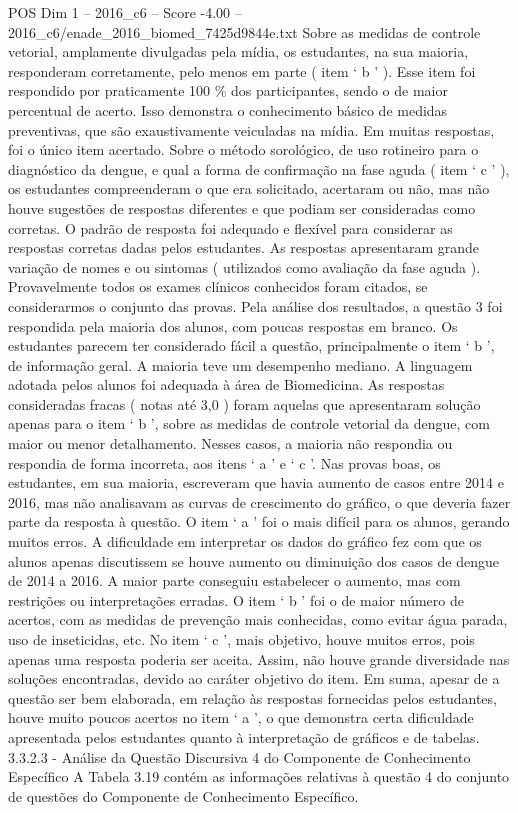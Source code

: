 \begin{textsample}{POS Dim 1 – 2016\_c6 – Score -4.00 – 2016\_c6/enade\_2016\_biomed\_7425d9844e.txt}
Sobre as medidas de controle vetorial, amplamente divulgadas pela mídia, os estudantes, na sua maioria, responderam corretamente, pelo menos em parte ( item ‘ b ’ ).
Esse item foi respondido por praticamente 100 \% dos participantes, sendo o de maior percentual de acerto.
Isso demonstra o conhecimento básico de medidas preventivas, que são exaustivamente veiculadas na mídia.
Em muitas respostas, foi o único item acertado.
Sobre o método sorológico, de uso rotineiro para o diagnóstico da dengue, e qual a forma de confirmação na fase aguda ( item ‘ c ’ ), os estudantes compreenderam o que era solicitado, acertaram ou não, mas não houve sugestões de respostas diferentes e que podiam ser consideradas como corretas.
O padrão de resposta foi adequado e flexível para considerar as respostas corretas dadas pelos estudantes.
As respostas apresentaram grande variação de nomes e ou sintomas ( utilizados como avaliação da fase aguda ).
Provavelmente todos os exames clínicos conhecidos foram citados, se considerarmos o conjunto das provas.
Pela análise dos resultados, a questão 3 foi respondida pela maioria dos alunos, com poucas respostas em branco.
Os estudantes parecem ter considerado fácil a questão, principalmente o item ‘ b ’, de informação geral.
A maioria teve um desempenho mediano.
A linguagem adotada pelos alunos foi adequada à área de Biomedicina.
As respostas consideradas fracas ( notas até 3,0 ) foram aquelas que apresentaram solução apenas para o item ‘ b ’, sobre as medidas de controle vetorial da dengue, com maior ou menor detalhamento.
Nesses casos, a maioria não respondia ou respondia de forma incorreta, aos itens ‘ a ’ e ‘ c ’.
Nas provas boas, os estudantes, em sua maioria, escreveram que havia aumento de casos entre 2014 e 2016, mas não analisavam as curvas de crescimento do gráfico, o que deveria fazer parte da resposta à questão.
O item ‘ a ’ foi o mais difícil para os alunos, gerando muitos erros.
A dificuldade em interpretar os dados do gráfico fez com que os alunos apenas discutissem se houve aumento ou diminuição dos casos de dengue de 2014 a 2016.
A maior parte conseguiu estabelecer o aumento, mas com restrições ou interpretações erradas.
O item ‘ b ’ foi o de maior número de acertos, com as medidas de prevenção mais conhecidas, como evitar água parada, uso de inseticidas, etc.
No item ‘ c ’, mais objetivo, houve muitos erros, pois apenas uma resposta poderia ser aceita.
Assim, não houve grande diversidade nas soluções encontradas, devido ao caráter objetivo do item.
Em suma, apesar de a questão ser bem elaborada, em relação às respostas fornecidas pelos estudantes, houve muito poucos acertos no item ‘ a ’, o que demonstra certa dificuldade apresentada pelos estudantes quanto à interpretação de gráficos e de tabelas. 3.3.2.3 - Análise da Questão Discursiva 4 do Componente de Conhecimento Específico A Tabela 3.19 contém as informações relativas à questão 4 do conjunto de questões do Componente de Conhecimento Específico.

\end{textsample}

